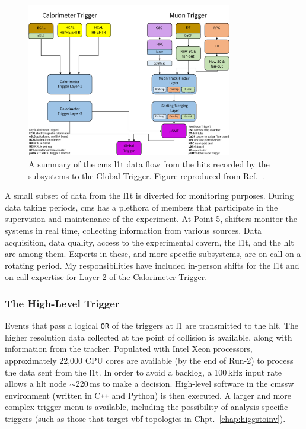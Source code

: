 \begin{figure}[htbp]
    \centering
    \includegraphics[width=0.8\textwidth]{figures/CMS_L1T_data_flow_key_ordered.pdf}
    \caption[A summary of the CMS Level-1 Trigger data flow from the hits recorded by the subsystems to the Global Trigger]{A summary of the \acrshort{cms} \acrlong{l1t} data flow from the hits recorded by the subsystems to the Global Trigger. Figure reproduced from Ref.~.}
    \label{fig:cms_l1t_data_flow}
\end{figure}

A small subset of data from the \acrshort{l1t} is diverted for monitoring purposes. During data taking periods, \acrshort{cms} has a plethora of members that participate in the supervision and maintenance of the experiment. At Point 5, shifters monitor the systems in real time, collecting information from various sources. Data acquisition, data quality, access to the experimental cavern, the \acrshort{l1t}, and the \acrshort{hlt} are among them. Experts in these, and more specific subsystems, are on call on a rotating period. My responsibilities have included in-person shifts for the \acrlong{l1t} and on call expertise for Layer-2 of the Calorimeter Trigger.




\subsubsection{The High-Level Trigger}
\label{subsubsec:detector_hlt}

Events that pass a logical \texttt{OR} of the triggers at \acrlong{l1} are transmitted to the \acrshort{hlt}. The higher resolution data collected at the point of collision is available, along with information from the tracker. Populated with Intel Xeon processors, approximately 22,000 CPU cores are available (by the end of Run-2) to process the data sent from the \acrshort{l1t}. In order to avoid a backlog, a 100\,kHz input rate allows a \acrshort{hlt} node $\sim$220\,ms to make a decision. High-level software in the \acrshort{cmssw} environment (written in C\texttt{++} and Python) is then executed. A larger and more complex trigger menu is available, including the possibility of analysis-specific triggers (such as those that target \acrshort{vbf} topologies in Chpt.~\ref{chap:higgstoinv}).

